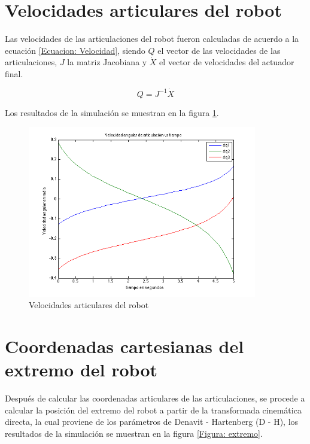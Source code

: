 \documentclass[11pt]{report} %
\begin{document}
	\section{Velocidades articulares del robot}

	Las velocidades de las articulaciones del robot fueron calculadas de acuerdo a la ecuación \ref{Ecuacion: Velocidad}, siendo $Q$ el vector de las velocidades de las articulaciones, $J$ la matriz Jacobiana y $\dot{X}$ el vector de velocidades del actuador final.

	\begin{equation}
		Q = {J}^{-1}\dot{X}
		\label{Ecuacion: Velocidad}
	\end{equation}

	Los resultados de la simulación se muestran en la figura \ref{Figura: Velocidad}.

	\begin{figure}[H]
		\centering
		\includegraphics[width=10cm]{Imagenes/velocidades.png}
		\caption{Velocidades articulares del robot}
		\label{Figura: Velocidad}
	\end{figure}

	\section{Coordenadas cartesianas del extremo del robot}

	Después de calcular las coordenadas articulares de las articulaciones, se procede a calcular la posición del extremo del robot a partir de la transformada cinemática directa, la cual proviene de los parámetros de Denavit - Hartenberg (D - H), los resultados de la simulación se muestran en la figura \ref{Figura: extremo}.
\end{document}
